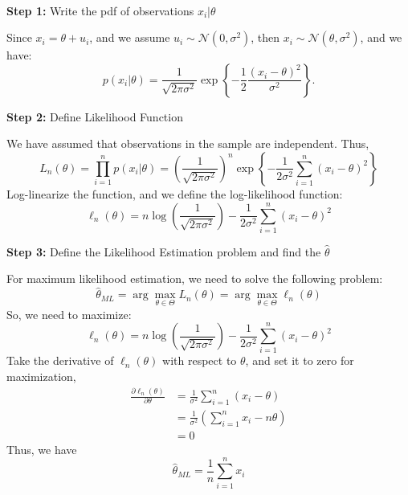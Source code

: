 \begin{solution}
    \

   \textbf{Step 1:} Write the pdf of observations $x_i | \theta$
   
   Since $x_i = \theta + u_i$, and we assume $u_i \sim \mathcal{N}(0, \sigma^2)$, then $x_i \sim \mathcal{N}(\theta, \sigma^2)$, and we have:
   \[
   p(x_i | \theta) = \frac{1}{\sqrt{2\pi\sigma^2}} \exp{\left\{-\frac{1}{2} \frac{(x_i - \theta)^2}{\sigma^2}\right\}}.
   \]

   \textbf{Step 2:} Define Likelihood Function

   We have assumed that observations in the sample are independent. Thus, 
   \[
   L_n(\theta) = \prod\limits_{i=1}^{n}p(x_i | \theta) = \left(\frac{1}{\sqrt{2\pi\sigma^2}}\right)^n \exp{\left\{-\frac{1}{2\sigma^2} \sum_{i=1}^{n} (x_i - \theta)^2\right\}}
   \]
   Log-linearize the function, and we define the log-likelihood function:
   \[
   \ell_{n}(\theta) = n\log{\left(\frac{1}{\sqrt{2\pi\sigma^2}}\right)} - \frac{1}{2\sigma^2} \sum_{i=1}^{n}(x_i - \theta)^2
   \]

   \textbf{Step 3:} Define the Likelihood Estimation problem and find the $\hat{\theta}$

   For maximum likelihood estimation, we need to solve the following problem:
   \[
       \hat{\theta}_{ML} = \arg\max\limits_{\theta \in \Theta}{L_n(\theta)} = \arg\max\limits_{\theta \in \Theta}{\ell_n(\theta)}
   \]
   So, we need to maximize:
   \[
   \ell_{n}(\theta) = n\log{\left(\frac{1}{\sqrt{2\pi\sigma^2}}\right)} - \frac{1}{2\sigma^2} \sum_{i=1}^{n}(x_i - \theta)^2
   \]
   Take the derivative of $\ell_n(\theta)$ with respect to $\theta$, and set it to zero for maximization,
   \begin{align*}
       \frac{\partial \ell_n(\theta)}{\partial \theta} &= \frac{1}{\sigma^2} \sum_{i=1}^{n}(x_i - \theta) \\
       &= \frac{1}{\sigma^2}(\sum_{i=1}^{n}x_i - n\theta) \\
       &= 0
   \end{align*}
   Thus, we have
   \[
   \hat{\theta}_{ML} = \frac{1}{n}\sum_{i=1}^{n}x_i
   \]
   
\end{solution}

